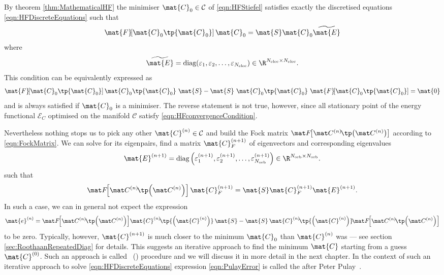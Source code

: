\begin{rem}
\label{rem:PropertiesDiscretised}
By theorem \vref{thm:MathematicalHF}
the minimiser $\mat{C}_0 \in \mathcal{C}$ of \eqref{eqn:HFStiefel}
satisfies exactly the discretised \HF equations \eqref{eqn:HFDiscreteEquations}
such that
\newcommand{\matFzfull}{\mat{F}\!\!\left[\mat{C}_0\tp{\mat{C}_0}\right]}
\[
	\matFzfull \mat{C}_0 = \mat{S} \mat{C}_0 \widetilde{\mat{E}}
\]
where
\[
	\widetilde{\mat{E}} = \text{diag}(\varepsilon_1, \varepsilon_2, \ldots,
		\varepsilon_{\Nelec}) \in \R^{\Nelec \times \Nelec}.
\]
This condition can be equivalently expressed as~\cite{Pulay1982}
\begin{equation}
	\matFzfull \mat{C}_0\tp{\mat{C}_0} \
	\mat{S} - \mat{S} \ \mat{C}_0\tp{\mat{C}_0} \ \matFzfull
	= \mat{0}
	\label{eqn:HFconvergenceCondition}
\end{equation}
and is always satisfied if $\mat{C}_0$ is a minimiser.
The reverse statement is not true, however,
since all stationary point of the energy functional
$\mathcal{E}_C$ optimised on the manifold $\mathcal{C}$
satisfy \eqref{eqn:HFconvergenceCondition}.

Nevertheless nothing stops us to pick any other $\mat{C}^{(n)} \in \mathcal{C}$
and build the Fock matrix $\matFnfull$
according to \eqref{eqn:FockMatrix}.
We can solve for its eigenpairs, \ie find a matrix $\mat{C}_F^{(n+1)}$
of eigenvectors and corresponding eigenvalues
\[
	\mat{E}^{(n+1)}
	= \text{diag}\left(\varepsilon_1^{(n+1)},
	\varepsilon_2^{(n+1)}, \ldots,
	\varepsilon_{\Norb}^{(n+1)}\right) \in \R^{\Norb \times \Norb}.
\]
such that
\begin{equation}
	\matFnfull \mat{C}_F^{(n+1)} = \mat{S} \mat{C}_F^{(n+1)} \mat{E}^{(n+1)}.
	\label{eqn:HFiterated}
\end{equation}
In such a case, we can in general not expect the expression
\begin{equation}
	\mat{e}^{(n)}
	= \matFnfull \! \mat{C}^{(n)}\!\tp{\left(\mat{C}^{(n)}\right)} \, \mat{S}
	- \mat{S} \, \mat{C}^{(n)}\!\tp{\left(\mat{C}^{(n)}\right)} \! \matFnfull
	\label{eqn:PulayError}
\end{equation}
to be zero.
Typically, however, $\mat{C}^{(n+1)}$ is
much closer to the minimum $\mat{C}_0$ than $\mat{C}^{(n)}$
was --- see section \vref{sec:RoothaanRepeatedDiag} for details.
This suggests an iterative approach to find the minimum $\mat{C}$
starting from a guess $\mat{C}^{(0)}$.
Such an approach is called ~(\SCF) procedure
and we will discuss it in more detail in the next chapter.
In the context of such an iterative approach
to solve \eqref{eqn:HFDiscreteEquations}
expression \eqref{eqn:PulayError} is called the 
after Peter Pulay~\cite{Pulay1982}.


\end{rem}
